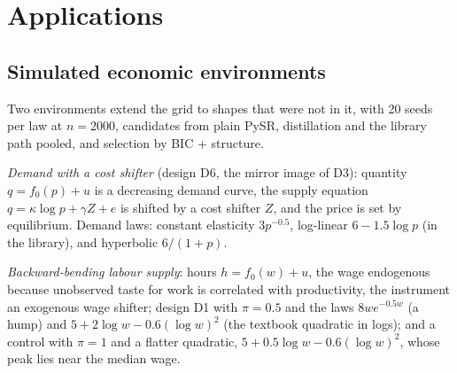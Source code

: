 \section{Applications}
\label{sec:apps}

\subsection{Simulated economic environments}
\label{sec:apps-sim}

Two environments extend the grid to shapes that were not in it, with 20 seeds per law at $n = 2000$, candidates from plain PySR, distillation and the library path pooled, and selection by BIC + structure.

\emph{Demand with a cost shifter} (design D6, the mirror image of D3): quantity $q = f_0(p) + u$ is a decreasing demand curve, the supply equation $q = \kappa\log p + \gamma Z + e$ is shifted by a cost shifter $Z$, and the price is set by equilibrium. Demand laws: constant elasticity $3p^{-0.5}$, log-linear $6 - 1.5\log p$ (in the library), and hyperbolic $6/(1 + p)$.

\emph{Backward-bending labour supply}: hours $h = f_0(w) + u$, the wage endogenous because unobserved taste for work is correlated with productivity, the instrument an exogenous wage shifter; design D1 with $\pi = 0.5$ and the laws $8we^{-0.5w}$ (a hump) and $5 + 2\log w - 0.6(\log w)^2$ (the textbook quadratic in logs); and a control with $\pi = 1$ and a flatter quadratic, $5 + 0.5\log w - 0.6(\log w)^2$, whose peak lies near the median wage.

